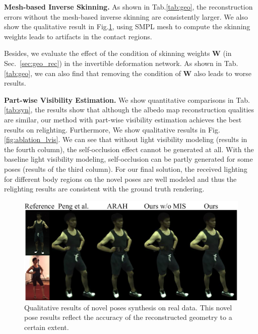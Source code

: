 \textbf{Mesh-based Inverse Skinning.}
As shown in Tab.\ref{tab:geo}, the reconstruction errors without the mesh-based inverse skinning are consistently larger.
We also show the qualitative result in Fig.\ref{fig:geo_artifact}, using SMPL mesh to compute the skinning weights leads to artifacts in the contact regions.

Besides, we evaluate the effect of the condition of skinning weights $\mathbf{W}$ (in Sec.~\ref{sec:geo_rec}) in the invertible deformation network.
As shown in Tab.\ref{tab:geo}, we can also find that removing the condition of $\mathbf{W}$ also leads to worse results.


\textbf{Part-wise Visibility Estimation.}
We show quantitative comparisons in Tab.\ref{tab:syn}, the results show that although the albedo map reconstruction qualities are similar, our method with part-wise visibility estimation achieves the best results on relighting.
Furthermore, We show qualitative results in Fig.\ref{fig:ablation_lvis}.
We can see that without light visibility modeling (results in the fourth column), the self-occlusion effect cannot be generated at all.
With the baseline light visibility modeling, self-occlusion can be partly generated for some poses (results of the third column).
For our final solution, the received lighting for different body regions on the novel poses are well modeled and thus the relighting results are consistent with the ground truth rendering.

\begin{figure}[t]
\begin{center}
   \includegraphics[width=1.0\linewidth]{./fig/geo_artifact.jpg}
\end{center}
\caption{Qualitative results of novel poses synthesis on real data. This novel pose results reflect the accuracy of the reconstructed geometry to a certain extent. }
\label{fig:geo_artifact}
\end{figure}

